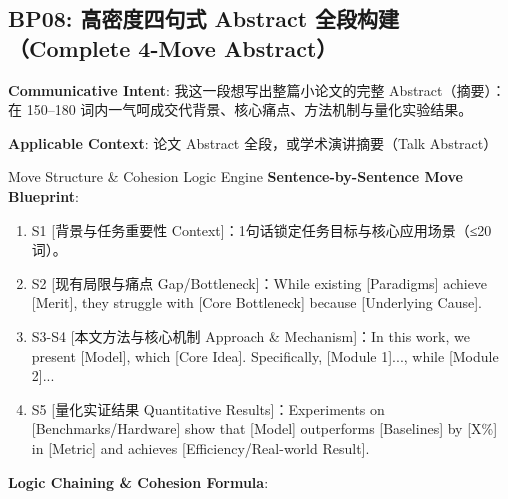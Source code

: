 \subsection{BP08: 高密度四句式 Abstract 全段构建（Complete 4-Move Abstract）}\label{sec:bp:BP08}
\noindent\textbf{\color{AcadNavy}Communicative Intent}: 我这一段想写出整篇小论文的完整 Abstract（摘要）：在 150--180 词内一气呵成交代背景、核心痛点、方法机制与量化实验结果。\par\vspace{2pt}
\noindent\textbf{\color{AcadSlate}Applicable Context}: 论文 Abstract 全段，或学术演讲摘要（Talk Abstract）\par\vspace{4pt}
\begin{ConceptBox}{Move Structure \& Cohesion Logic Engine}
\textbf{Sentence-by-Sentence Move Blueprint}:
\begin{enumerate}[label=\textbf{\color{AcadNavy}S\arabic*.}, leftmargin=2em, itemsep=2pt]
  \item S1 [背景与任务重要性 Context]：1句话锁定任务目标与核心应用场景（≤20词）。
  \item S2 [现有局限与痛点 Gap/Bottleneck]：While existing [Paradigms] achieve [Merit], they struggle with [Core Bottleneck] because [Underlying Cause].
  \item S3-S4 [本文方法与核心机制 Approach \& Mechanism]：In this work, we present [Model], which [Core Idea]. Specifically, [Module 1]..., while [Module 2]...
  \item S5 [量化实证结果 Quantitative Results]：Experiments on [Benchmarks/Hardware] show that [Model] outperforms [Baselines] by [X\%] in [Metric] and achieves [Efficiency/Real-world Result].
\end{enumerate}\par\vspace{4pt}
\textbf{Logic Chaining \& Cohesion Formula}:\par{}
\end{ConceptBox}
